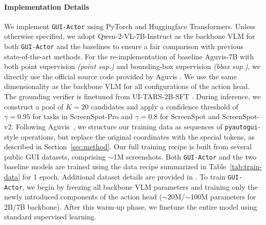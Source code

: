\documentclass{article}
\newcommand{\sys}{\texttt{GUI-Actor}\xspace}
\begin{document}

\paragraph{Implementation Details}
We implement \sys using PyTorch and Huggingface Transformers.
Unless otherwise specified, we adopt Qwen-2-VL-7B-Instruct \cite{wang2024qwen2} as the backbone VLM for both \sys and the baselines to ensure a fair comparison with previous state-of-the-art methods.
For the re-implementation of baseline Aguvis-7B with both point supervision \textit{(point sup.)} and bounding-box supervision \textit{(bbox sup.)}, we directly use the official source code provided by Aguvis \cite{xu2024aguvis}.
We use the same dimensionality as the backbone VLM for all configurations of the action head.
The grounding verifier is finetuned from UI-TARS-2B-SFT \cite{qin2025ui}. During inference, we construct a pool of $K=20$ candidates and apply a confidence threshold of $\gamma=0.95$ for tasks in ScreenSpot-Pro and $\gamma=0.8$ for ScreenSpot and ScreenSpot-v2.
Following Aguvis~\citep{xu2024aguvis}, we structure our training data as sequences of \texttt{pyautogui}-style operations, but replace the original coordinates with the special tokens, as described in Section~\ref{sec:method}.
Our full training recipe is built from several public GUI datasets, comprising $\sim$1M screenshots.
Both \sys and the two baseline models are trained using the data recipe summarized in Table~\ref{tab:train-data} for 1 epoch. Additional dataset details are provided in .
To train \sys, we begin by freezing all backbone VLM parameters and training only the newly introduced components of the action head ($\sim$20M/$\sim$100M parameters for 2B/7B backbone). After this warm-up phase, we finetune the entire model using standard supervised learning.
\end{document}
